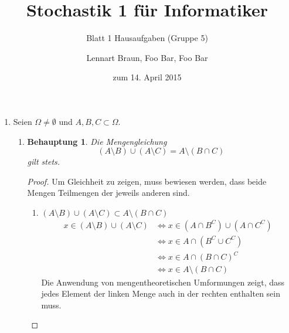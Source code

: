 \documentclass[a4paper]{scrartcl}
\title{Stochastik 1 für Informatiker}
\subtitle{Blatt 1 Hausaufgaben (Gruppe 5)}
\author{
	Lennart Braun,
    Foo Bar,
    Foo Bar
}
\date{zum 14. April 2015}
\newtheorem*{behaupt}{Behauptung}
\newcommand{\gdw}{\Leftrightarrow}
\begin{document}

\begin{enumerate}[label=\bfseries\arabic*.]
    \item
        Seien $\Omega \neq \emptyset$ und $A,B,C \subset \Omega$.
        \begin{enumerate}[label=(\alph*)]
            \item
                \begin{behaupt}
                    Die Mengengleichung
                    \begin{equation}
                        (A \setminus B) \cup (A \setminus C)
                        = A \setminus (B \cap C)
                    \end{equation}
                    gilt stets.
                \end{behaupt}
                \begin{proof}
                    Um Gleichheit zu zeigen, muss bewiesen werden, dass beide
                    Mengen Teilmengen der jeweils anderen sind.
                    \begin{enumerate}
                        \item
                            $(A \setminus B) \cup (A \setminus C)
                            \subset A \setminus (B \cap C)$ \\
                            \begin{equation}
                                \begin{split}
                                    x \in (A \setminus B) \cup (A \setminus C)
                                    &\gdw x \in (A \cap B^C) \cup (A \cap C^C)\\
                                    &\gdw x \in A \cap (B^C \cup C^C) \\
                                    &\gdw x \in A \cap (B \cap C)^C \\
                                    &\gdw x \in A \setminus (B \cap C)
                                \end{split}
                            \end{equation}
                            Die Anwendung von mengentheoretischen Umformungen
                            zeigt, dass jedes Element der linken Menge auch in
                            der rechten enthalten sein muss.


\end{enumerate}
\end{proof}
\end{enumerate}
\end{enumerate}
\end{document}
